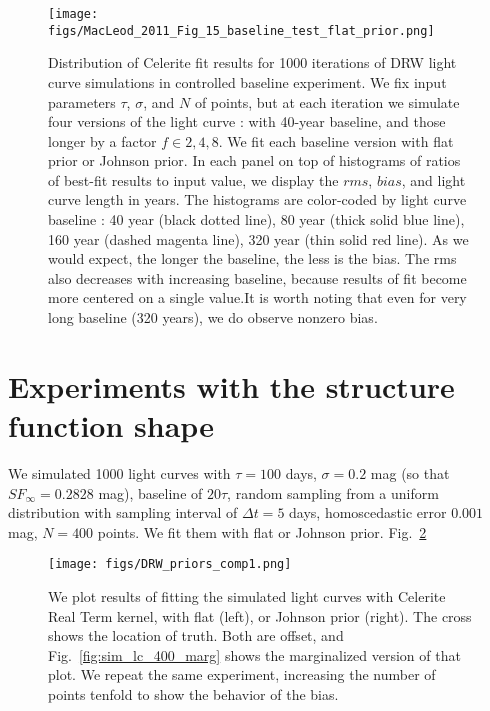 \documentclass[fleqn,usenatbib]{mnras}  %
\begin{document}
\begin{figure}
\texttt{[image: figs/MacLeod\_2011\_Fig\_15\_baseline\_test\_flat\_prior.png]}
\caption{Distribution of Celerite fit results for 1000 iterations of DRW light curve simulations in controlled baseline experiment.  We fix input parameters $\tau$, $\sigma$, and $N$ of points,  but at each iteration we simulate four versions of the light curve  : with 40-year baseline, and those longer by a factor $f \in {2,4,8}$. We fit each baseline version with flat prior or Johnson prior. In each panel  on top of histograms of ratios of best-fit results to input value, we display the $rms$, $bias$, and light curve length in years. The histograms are color-coded by light curve baseline : 40 year (black dotted line), 80 year (thick solid blue line), 160 year (dashed magenta line), 320 year (thin solid red line). As we would expect, the longer the baseline, the less is the bias. The rms also decreases with increasing baseline, because results of fit become more centered on a single value.It is worth noting that even for very long baseline (320 years), we do observe nonzero bias.  }
\label{fig:macleod11_15_baseline}
\end{figure}


\section{Experiments with the structure function shape}
We simulated 1000 light curves with $\tau=100$ days, $\sigma=0.2$ mag (so that $SF_{\infty}=0.2828$ mag), baseline of $20 \tau$, random sampling from  a uniform distribution with sampling interval of $\Delta t=5$ days,   homoscedastic error $0.001$ mag, $N=400$ points. We fit them with flat or Johnson prior. Fig.~\ref{fig:sim_lc_400}



\begin{figure*}
\texttt{[image: figs/DRW\_priors\_comp1.png]}
\caption{We plot results of fitting the simulated light curves with Celerite Real Term kernel, with flat (left), or Johnson prior (right). The cross shows the location of truth.  Both are offset, and Fig.~\ref{fig:sim_lc_400_marg} shows the marginalized version of that plot. We repeat the same experiment,  increasing the number of points tenfold to show the behavior of the bias. }
\label{fig:sim_lc_400}
\end{figure*} 
\end{document}

